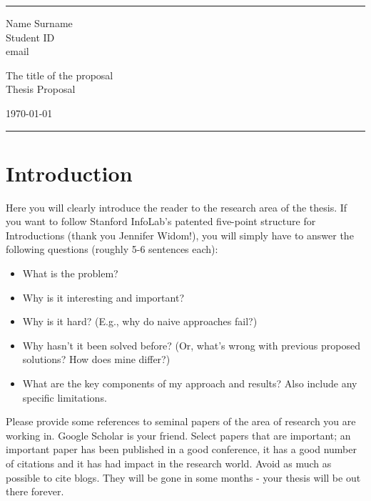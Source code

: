 \documentclass[a4paper]{article}
\begin{document}

\fancyhead[C]{}
\hrule \medskip %
\begin{minipage}{0.295\textwidth} 
\raggedright
\footnotesize
Name Surname \hfill\\   
Student ID \hfill\\
email
\end{minipage}
\begin{minipage}{0.4\textwidth} 
\centering 
\large 
The title of the proposal\\ 
\normalsize 
Thesis Proposal\\ 
\end{minipage}
\begin{minipage}{0.295\textwidth} 
\raggedleft
\today\hfill\\
\end{minipage}
\medskip\hrule 
\bigskip


\section{Introduction}
Here you will clearly introduce the reader to the research area of the thesis. If you want to follow Stanford InfoLab's patented five-point structure for Introductions (thank you Jennifer Widom!), you will simply have to answer the following questions (roughly 5-6 sentences each):
\begin{itemize}
    \item What is the problem? 
    \item Why is it interesting and important?
    \item Why is it hard? (E.g., why do naive approaches fail?)
    \item Why hasn't it been solved before? (Or, what's wrong with previous proposed solutions? How does mine differ?)
    \item What are the key components of my approach and results? Also include any specific limitations.
\end{itemize}

Please provide some references to seminal papers of the area of research you are working in. Google Scholar is your friend. Select papers that are important; an important paper has been published in a good conference, it has a good number of citations and it has had impact in the research world. Avoid as much as possible to cite blogs. They will be gone in some months - your thesis will be out there forever. 
\end{document}
